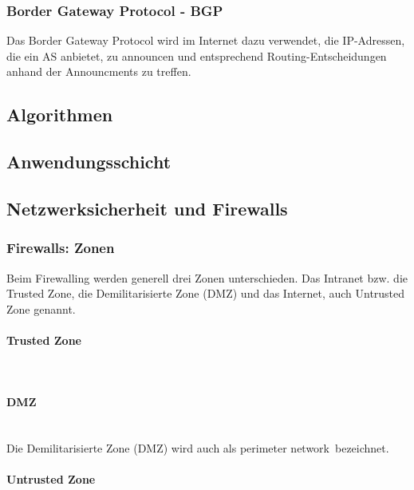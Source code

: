 \subsubsection{Border Gateway Protocol - BGP}

Das Border Gateway Protocol wird im Internet dazu verwendet, die IP-Adressen, die ein AS anbietet, zu announcen und entsprechend Routing-Entscheidungen anhand der Announcments zu treffen.

\subsection{Algorithmen}



\subsection{Anwendungsschicht}

\subsection{Netzwerksicherheit und Firewalls}

\subsubsection{Firewalls: Zonen}

Beim Firewalling werden generell drei Zonen unterschieden. Das Intranet bzw. die Trusted Zone, die Demilitarisierte Zone (DMZ) und das Internet, auch Untrusted Zone genannt.

\paragraph{Trusted Zone}~\\
\paragraph{DMZ}~\\

Die Demilitarisierte Zone (DMZ) wird auch als \ql perimeter network\qr\ bezeichnet.

\paragraph{Untrusted Zone}~\\


